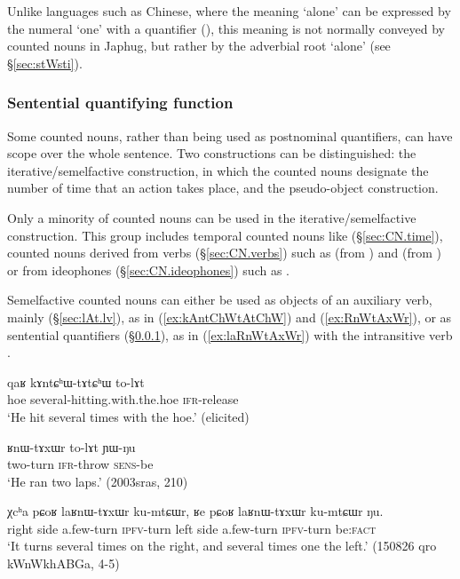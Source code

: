 Unlike languages such as Chinese, where the meaning  `alone' can be expressed by the numeral `one' with a quantifier (), this meaning is not normally conveyed by counted nouns in Japhug, but rather by the adverbial root  `alone' (see §\ref{sec:stWsti}).

\subsubsection{Sentential quantifying function } \label{sec:CN.iterative}
Some counted nouns, rather than being used as postnominal quantifiers, can have scope over the whole sentence. Two constructions can be distinguished: the iterative/semelfactive construction, in which the counted nouns designate the number of time that an action takes place, and the pseudo-object construction.

Only a minority of counted nouns can be used in the iterative/semelfactive construction. This group includes temporal counted nouns like  (§\ref{sec:CN.time}),  counted nouns derived from verbs (§\ref{sec:CN.verbs})  such as  (from ) and  (from ) or from ideophones  (§\ref{sec:CN.ideophones}) such as .

Semelfactive counted nouns can either be used as objects of an auxiliary verb, mainly  (§\ref{sec:lAt.lv}), as in (\ref{ex:kAntChWtAtChW}) and (\ref{ex:RnWtAxWr}), or as sentential quantifiers (§\ref{sec:CN.iterative}), as in (\ref{ex:laRnWtAxWr}) with the intransitive verb .

\begin{exe}
	\ex \label{ex:kAntChWtAtChW}
	\gll qaʁ kɤntɕʰɯ-tɤtɕʰɯ to-lɤt \\
	hoe several-hitting.with.the.hoe \textsc{ifr}-release \\
	\glt `He hit several times with the hoe.' (elicited)
\end{exe}

\begin{exe}
	\ex \label{ex:RnWtAxWr}
	\gll ʁnɯ-tɤxɯr to-lɤt ɲɯ-ŋu \\
	two-turn \textsc{ifr}-throw \textsc{sens}-be \\
	\glt `He ran two laps.' (2003sras, 210)
\end{exe}

\begin{exe}
	\ex \label{ex:laRnWtAxWr}
	\gll χcʰa pɕoʁ laʁnɯ-tɤxɯr ku-mtɕɯr, ʁe pɕoʁ laʁnɯ-tɤxɯr ku-mtɕɯr ŋu. \\
	right side a.few-turn \textsc{ipfv}-turn left side a.few-turn \textsc{ipfv}-turn be:\textsc{fact} \\
	\glt `It turns several times on the right, and several times one the left.' (150826 qro kWnWkhABGa, 4-5)
\end{exe}


